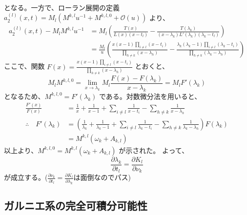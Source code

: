 \documentclass[paper=a4, fontsize=11pt]{jlreq} %
\theoremstyle{break}
\theoremstyle{qa}
\begin{document}
となる。一方で、ローラン展開の定義 $a_2^{(l)}(x,t) = M_l(M^{k,l}u^{-1} + M^{k,l,0} + \mathcal{O}(u))$ より、
\begin{align*}
    a_2^{(l)}(x,t) - M_l M^{k,l} u^{-1} &= M_l \left( \frac{T(x)}{L(x)(x-t_l)} - \frac{T(\lambda_k)}{(x-\lambda_k)L'(\lambda_k)(\lambda_k-t_l)} \right) \\
    &= \frac{M_l}{u} \left( \frac{x(x-1)\prod_{i \neq l}(x-t_i)}{\prod_{h \neq k}(x-\lambda_h)} - \frac{\lambda_k(\lambda_k-1)\prod_{i \neq l}(\lambda_k-t_i)}{\prod_{h \neq k}(\lambda_k-\lambda_h)} \right)
\end{align*}
ここで、関数 $F(x) = \frac{x(x-1)\prod_{i \neq l}(x-t_i)}{\prod_{h \neq k}(x-\lambda_h)}$ とおくと、
\begin{equation*}
    M_l M^{k,l,0} = \lim_{x \to \lambda_k} M_l \frac{F(x) - F(\lambda_k)}{x-\lambda_k} = M_l F'(\lambda_k)
\end{equation*}
となるため、$M^{k,l,0} = F'(\lambda_k)$ である。対数微分法を用いると、
\begin{align*}
    \frac{F'(x)}{F(x)} &= \frac{1}{x} + \frac{1}{x-1} + \sum_{i \neq l} \frac{1}{x-t_i} - \sum_{h \neq k} \frac{1}{x-\lambda_h} \\
    \therefore \quad F'(\lambda_k) &= \left( \frac{1}{\lambda_k} + \frac{1}{\lambda_k-1} + \sum_{i \neq l} \frac{1}{\lambda_k-t_i} - \sum_{h \neq k} \frac{1}{\lambda_k-\lambda_h} \right) F(\lambda_k) \\
    &= M^{k,l}(\omega_k + A_{k,l})
\end{align*}
以上より、$M^{k,l,0} = M^{k,l}(\omega_k + A_{k,l})$ が示された。
よって、
\begin{equation*}
    \frac{\partial \lambda_k}{\partial t_l} = \frac{\partial K_l}{\partial \nu_k}
\end{equation*}
が成立する。($\frac{\partial \nu_k}{\partial t_l} = \frac{\partial K_l}{\partial \lambda_k}$は面倒なのでパス)

\subsection{ガルニエ系の完全可積分可能性}
\end{document}
